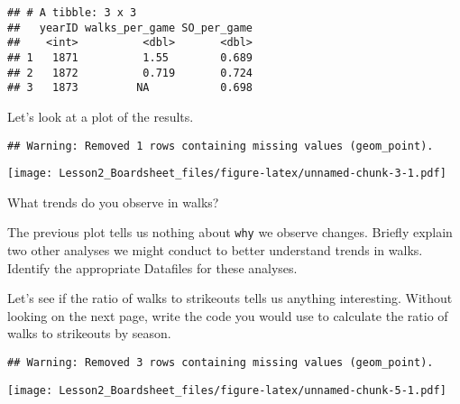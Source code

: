 \documentclass[]{article}
\newenvironment{Shaded}{\begin{snugshade}}{\end{snugshade}}
\newcommand{\KeywordTok}[1]{\textcolor[rgb]{0.13,0.29,0.53}{\textbf{#1}}}
\newcommand{\DataTypeTok}[1]{\textcolor[rgb]{0.13,0.29,0.53}{#1}}
\newcommand{\StringTok}[1]{\textcolor[rgb]{0.31,0.60,0.02}{#1}}
\newcommand{\OperatorTok}[1]{\textcolor[rgb]{0.81,0.36,0.00}{\textbf{#1}}}
\newcommand{\NormalTok}[1]{#1}
\begin{document}
\begin{verbatim}
## # A tibble: 3 x 3
##   yearID walks_per_game SO_per_game
##    <int>          <dbl>       <dbl>
## 1   1871          1.55        0.689
## 2   1872          0.719       0.724
## 3   1873         NA           0.698
\end{verbatim}

Let's look at a plot of the results.

\begin{Shaded}
\end{Shaded}

\begin{verbatim}
## Warning: Removed 1 rows containing missing values (geom_point).
\end{verbatim}

\texttt{[image: Lesson2\_Boardsheet\_files/figure-latex/unnamed-chunk-3-1.pdf]}

What trends do you observe in walks? \vspace{0.75in}

The previous plot tells us nothing about \texttt{why} we observe
changes. Briefly explain two other analyses we might conduct to better
understand trends in walks. Identify the appropriate Datafiles for these
analyses. \vspace{0.75in}

Let's see if the ratio of walks to strikeouts tells us anything
interesting. Without looking on the next page, write the code you would
use to calculate the ratio of walks to strikeouts by season.

\begin{Shaded}
\end{Shaded}

\begin{Shaded}
\end{Shaded}

\begin{verbatim}
## Warning: Removed 3 rows containing missing values (geom_point).
\end{verbatim}

\texttt{[image: Lesson2\_Boardsheet\_files/figure-latex/unnamed-chunk-5-1.pdf]}
\end{document}
